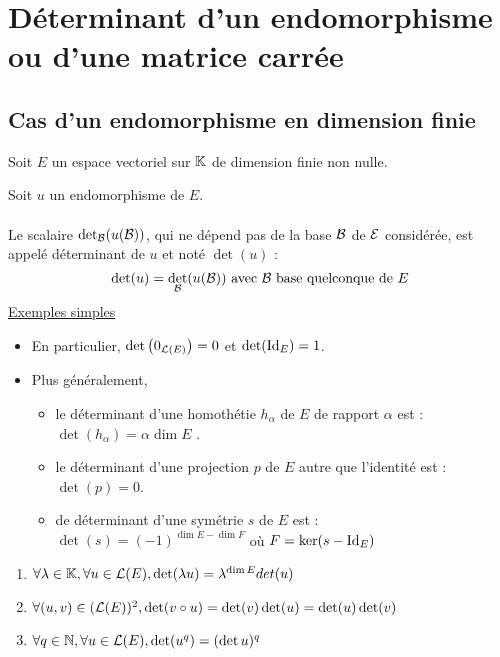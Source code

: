 \section{Déterminant d’un endomorphisme ou d’une matrice carrée}
\subsection{Cas d’un endomorphisme en dimension finie}
    Soit \(E\) un espace vectoriel sur \(\K\) de dimension finie non nulle.
\begin{theo}
    Soit \(u\) un endomorphisme de \(E\).\\~\\
    Le scalaire \(\det_{\cal{B}} (u(\cal{B}))\), qui ne dépend pas de la base \(\cal{B}\) de \(\cal{E}\) considérée, est appelé déterminant de \(u\) et noté \(\det(u)\) :
    \[\det (u) = \det_{\cal{B}} (u(\cal{B})) \text{ avec }\cal{B} \text{ base quelconque de } E\]
    \underline{Exemples simples}\\
    \begin{itemize}
        \item En particulier, \( \det\paren{ 0_{\cal{L}(E)}} = 0\) et \(\det (\id{E} ) = 1\).
        \item Plus généralement,
        \begin{itemize}
            \item le déterminant d’une homothétie \(h_\alpha\)  de \(E\) de rapport \(\alpha\)  est : \(\det (h_{\alpha} ) = \alpha  \dim E\) .
            \item le déterminant d’une projection \(p\) de \(E\) autre que l’identité est : \(\det (p) = 0\).
            \item de déterminant d’une symétrie \(s\) de \(E\) est : \(\det (s) = (-1)^{\dim E-\dim F}\) où \( F = \ker(s - \id{E} )\)
        \end{itemize}
    \end{itemize}
\end{theo}
\begin{prop}
    \begin{enumerate}
        \item \(\forall \lambda \in  \K, \forall u \in  \cal{L}(E), \det (\lambda u) = \lambda ^{\dim E} det (u)\)
        \item \(\forall (u, v) \in  (\cal{L}(E))^2 , \det (v \circ u) = \det (v) \det (u) = \det (u) \det (v)\)
        \item \(\forall q \in \N, \forall u \in  \cal{L}(E) , \det (u^q) = (\det u)^q \)
    \end{enumerate}
\end{prop}

